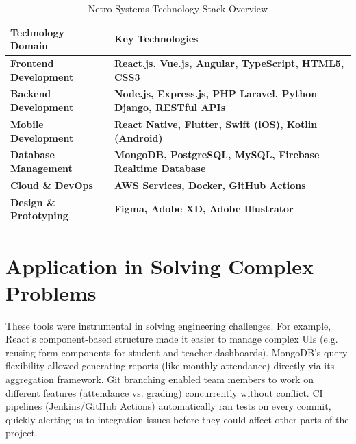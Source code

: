 \documentclass[12pt,a4paper]{report}
\newcommand{\tableheaderrow}{\rowcolor{tableheader}}
\newcommand{\tablealtrow}{\rowcolor{tablealt1}}
\newcommand{\tech}[1]{\textcolor{techcolor}{\textbf{#1}}}
\newcommand{\impact}[1]{\textcolor{impactcolor}{\textbf{#1}}}
\let\oldcite\cite
\renewcommand{\cite}[1]{\textcolor{impactcolor}{\oldcite{#1}}}
\begin{document}
\begin{table}[h!]
\centering
\caption{Netro Systems Technology Stack Overview}
\label{tab:tech_ecosystem}
\begin{tabular}{@{}p{7cm}p{8cm}@{}}
\toprule
\tableheaderrow \textcolor{headertext} {\textbf{Technology Domain}} & \textcolor{headertext} {\textbf{Key Technologies}} \\
\midrule
\impact{Frontend Development} & \tech{React.js, Vue.js, Angular, TypeScript, HTML5, CSS3} \\
\tablealtrow \impact{Backend Development} & \tech{Node.js, Express.js, PHP Laravel, Python Django, RESTful APIs} \\
\impact{Mobile Development} & \tech{React Native, Flutter, Swift (iOS), Kotlin (Android)} \\
\tablealtrow \impact{Database Management} & \tech{MongoDB, PostgreSQL, MySQL, Firebase Realtime Database} \\
\impact{Cloud \& DevOps} & \tech{AWS \cite{ref7} Services, Docker, GitHub Actions} \\
\tablealtrow \impact{Design \& Prototyping} & \tech{Figma, Adobe XD, Adobe Illustrator} \\
\bottomrule
\end{tabular}
\end{table}


\section{Application in Solving Complex Problems}
These tools were instrumental in solving engineering challenges. For example, React’s component-based structure made it easier to manage complex UIs (e.g. reusing form components for student and teacher dashboards). MongoDB’s query flexibility allowed generating reports (like monthly attendance) directly via its aggregation framework. Git branching enabled team members to work on different features (attendance vs. grading) concurrently without conflict. CI pipelines (Jenkins/GitHub Actions) automatically ran tests on every commit, quickly alerting us to integration issues before they could affect other parts of the project.

\newpage
\end{document}
